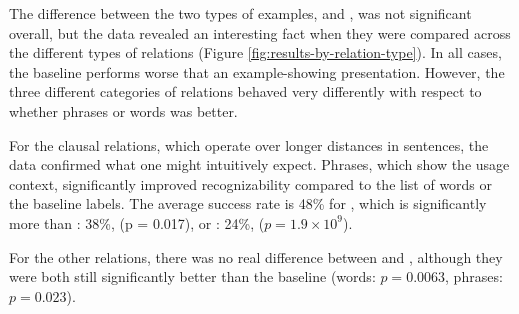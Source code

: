 The difference between the two types of examples,   and ,  was not significant overall, but the data revealed an interesting fact when they were compared across the different types  of relations (Figure \ref{fig:results-by-relation-type}). In all cases, the baseline performs worse that an example-showing presentation. However, the three different categories of relations behaved very differently with respect to whether phrases or words was better.

For the clausal relations, which operate over longer distances in sentences, the data confirmed what one might intuitively expect. Phrases, which show the usage context, significantly improved recognizability compared to the list of words or the baseline labels. The average success rate is 48\% for , which is significantly more than : 38\%, (p = 0.017), or : 24\%, ($p= 1.9 \times 10^9$).

For the other relations, there was no real difference between  and , although they were both still significantly better than the baseline (words: $p=0.0063$, phrases: $p=0.023$).

